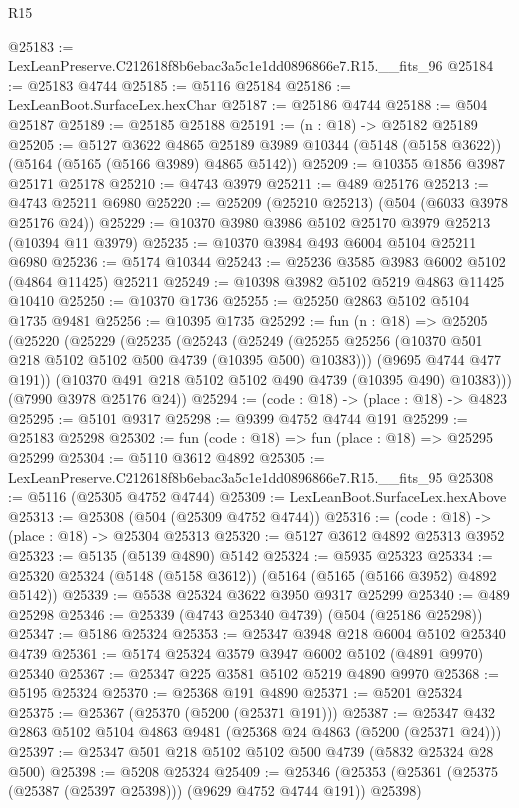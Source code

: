 \begin{lexlean}{R15}
\begin{coremodule}
{{{{{{{{{{{@25183 := LexLeanPreserve.C212618f8b6ebac3a5c1e1dd0896866e7.R15.__fits_96
@25184 := @25183 @4744
@25185 := @5116 @25184
@25186 := LexLeanBoot.SurfaceLex.hexChar
@25187 := @25186 @4744
@25188 := @504 @25187
@25189 := @25185 @25188
@25191 := (n : @18) -> @25182 @25189
@25205 := @5127
    @3622
    @4865
    @25189
    @3989
    @10344
    (@5148 (@5158 @3622))
    (@5164 (@5165 (@5166 @3989) @4865 @5142))
@25209 := @10355 @1856 @3987 @25171 @25178
@25210 := @4743 @3979
@25211 := @489 @25176
@25213 := @4743 @25211 @6980
@25220 := @25209 (@25210 @25213) (@504 (@6033 @3978 @25176 @24))
@25229 := @10370 @3980 @3986 @5102 @25170 @3979 @25213 (@10394 @11 @3979)
@25235 := @10370 @3984 @493 @6004 @5104 @25211 @6980
@25236 := @5174 @10344
@25243 := @25236 @3585 @3983 @6002 @5102 (@4864 @11425) @25211
@25249 := @10398 @3982 @5102 @5219 @4863 @11425 @10410
@25250 := @10370 @1736
@25255 := @25250 @2863 @5102 @5104 @1735 @9481
@25256 := @10395 @1735
@25292 := fun (n : @18) =>
  @25205
    (@25220
      (@25229
        (@25235
          (@25243
            (@25249 (@25255 @25256 (@10370 @501 @218 @5102 @5102 @500 @4739 (@10395 @500) @10383)))
            (@9695 @4744 @477 @191))
          (@10370 @491 @218 @5102 @5102 @490 @4739 (@10395 @490) @10383)))
      (@7990 @3978 @25176 @24))
@25294 := (code : @18) -> (place : @18) -> @4823
@25295 := @5101 @9317
@25298 := @9399 @4752 @4744 @191
@25299 := @25183 @25298
@25302 := fun (code : @18) => fun (place : @18) => @25295 @25299
@25304 := @5110 @3612 @4892
@25305 := LexLeanPreserve.C212618f8b6ebac3a5c1e1dd0896866e7.R15.__fits_95
@25308 := @5116 (@25305 @4752 @4744)
@25309 := LexLeanBoot.SurfaceLex.hexAbove
@25313 := @25308 (@504 (@25309 @4752 @4744))
@25316 := (code : @18) -> (place : @18) -> @25304 @25313
@25320 := @5127 @3612 @4892 @25313 @3952
@25323 := @5135 (@5139 @4890) @5142
@25324 := @5935 @25323
@25334 := @25320 @25324 (@5148 (@5158 @3612)) (@5164 (@5165 (@5166 @3952) @4892 @5142))
@25339 := @5538 @25324 @3622 @3950 @9317 @25299
@25340 := @489 @25298
@25346 := @25339 (@4743 @25340 @4739) (@504 (@25186 @25298))
@25347 := @5186 @25324
@25353 := @25347 @3948 @218 @6004 @5102 @25340 @4739
@25361 := @5174 @25324 @3579 @3947 @6002 @5102 (@4891 @9970) @25340
@25367 := @25347 @225 @3581 @5102 @5219 @4890 @9970
@25368 := @5195 @25324
@25370 := @25368 @191 @4890
@25371 := @5201 @25324
@25375 := @25367 (@25370 (@5200 (@25371 @191)))
@25387 := @25347 @432 @2863 @5102 @5104 @4863 @9481 (@25368 @24 @4863 (@5200 (@25371 @24)))
@25397 := @25347 @501 @218 @5102 @5102 @500 @4739 (@5832 @25324 @28 @500)
@25398 := @5208 @25324
@25409 := @25346 (@25353 (@25361 (@25375 (@25387 (@25397 @25398))) (@9629 @4752 @4744 @191)) @25398)
}}}}}}}}}}}
\end{coremodule}
\end{lexlean}
